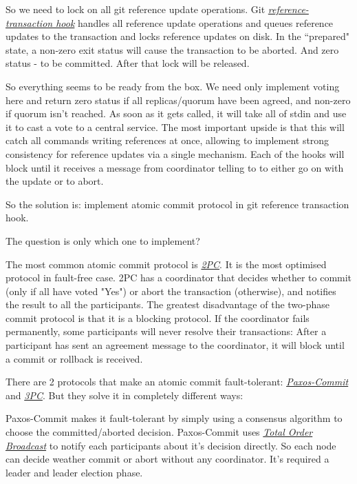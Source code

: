 \documentclass[acmlarge, screen, nonacm]{acmart}
\begin{document}
So we need to lock on all git reference update operations.
Git \emph{\href{https://git-scm.com/docs/githooks.html\#_reference_transaction}{reference-transaction hook}}
handles all reference update operations and queues reference updates to the transaction and locks reference updates on disk.
In the ``prepared" state, a non-zero exit status will cause the transaction to be aborted.
And zero status - to be committed.
After that lock will be released.

So everything seems to be ready from the box.
We need only implement voting here and return zero status if all replicas/quorum have been agreed, and non-zero if quorum isn't reached.
As soon as it gets called, it will take all
of stdin and use it to cast a vote to a central service.
The most important upside is that this will catch all commands writing
references at once, allowing to implement strong consistency for
reference updates via a single mechanism.
Each of the hooks will block until it receives a message from coordinator telling to to either go on with the update or to abort.

So the solution is: implement atomic commit protocol in git reference transaction hook.

The question is only which one to implement?

The most common atomic commit protocol is
\emph{\href{https://en.wikipedia.org/wiki/Two-phase_commit_protocol}{2PC}}.
It is the most optimised protocol in fault-free case.
2PC has a coordinator that decides whether to commit (only if all have voted "Yes") or abort the transaction (otherwise),
and notifies the result to all the participants.
The greatest disadvantage of the two-phase commit protocol is that it is a blocking protocol.
If the coordinator fails permanently, some participants will never resolve their transactions:
After a participant has sent an agreement message to the coordinator, it will block until a commit or rollback is received.

There are 2 protocols that make an atomic commit fault-tolerant:
\emph{\href{https://dsf.berkeley.edu/cs286/papers/paxoscommit-tods2006.pdf}{Paxos-Commit}}
and
\emph{\href{https://en.wikipedia.org/wiki/Three-phase_commit_protocol}{3PC}}.
But they solve it in completely different ways:

Paxos-Commit makes it fault-tolerant by simply using a consensus
algorithm to choose the committed/aborted decision.
Paxos-Commit uses
\emph{\href{https://en.wikipedia.org/wiki/Atomic_broadcast}{Total Order Broadcast}}
to notify each participants about it's decision directly.
So each node can decide weather commit or abort without any coordinator.
It's required a leader and leader election phase.
\end{document}

